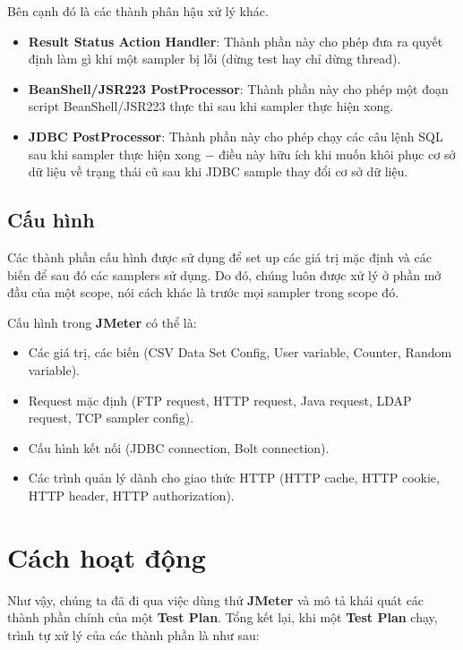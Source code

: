 \documentclass[12pt]{report}
\newcommand{\jmeter}{\textbf{JMeter}}
\begin{document}
\par Bên cạnh đó là các thành phân hậu xử lý khác.

\begin{itemize}
    \item \textbf{Result Status Action Handler}: Thành phần này cho phép đưa ra quyết định làm gì khi một sampler bị lỗi (dừng test hay chỉ dừng thread).
    \item \textbf{BeanShell/JSR223 PostProcessor}: Thành phần này cho phép một đoạn script BeanShell/JSR223 thực thi sau khi sampler thực hiện xong.
    \item \textbf{JDBC PostProcessor}: Thành phần này cho phép chạy các câu lệnh SQL sau khi sampler thực hiện xong $-$ điều này hữu ích khi muốn khôi phục cơ sở dữ liệu về trạng thái cũ sau khi JDBC sample thay đổi cơ sở dữ liệu.
\end{itemize}

\subsection{Cấu hình}

\par Các thành phần cấu hình được sử dụng để set up các giá trị mặc định và các biến để sau đó các samplers sử dụng. Do đó, chúng luôn được xử lý ở phần mở đầu của một scope, nói cách khác là trước mọi sampler trong scope đó.

\par Cấu hình trong \jmeter{} có thể là:
\begin{itemize}
    \item Các giá trị, các biến (CSV Data Set Config, User variable, Counter, Random variable).
    \item Request mặc định (FTP request, HTTP request, Java request, LDAP request, TCP sampler config).
    \item Cấu hình kết nối (JDBC connection, Bolt connection).
    \item Các trình quản lý dành cho giao thức HTTP (HTTP cache, HTTP cookie, HTTP header, HTTP authorization).
\end{itemize}

\section{Cách hoạt động}

\par Như vậy, chúng ta đã đi qua việc dùng thử \jmeter{} và mô tả khái quát các thành phần chính của một \textbf{Test Plan}. Tổng kết lại, khi một \textbf{Test Plan} chạy, trình tự xử lý của các thành phần là như sau:
\end{document}
